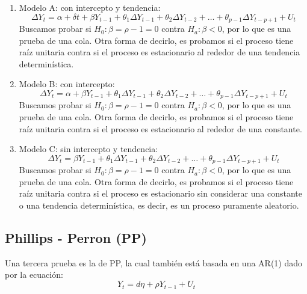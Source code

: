 \documentclass[
]{book}
\begin{document}
\begin{enumerate}
\def\labelenumi{\arabic{enumi}.}
\item
  Modelo A: con intercepto y tendencia:
  \begin{equation*}
  \Delta Y_t = \alpha + \delta t + \beta Y_{t-1} + \theta_1 \Delta Y_{t-1} + \theta_2 \Delta Y_{t-2} + \ldots + \theta_{p-1} \Delta Y_{t-p+1} + U_t
    \end{equation*}
  Buscamos probar si \(H_0 : \beta = \rho - 1 = 0\) contra \(H_a : \beta < 0\), por lo que es una prueba de una cola. Otra forma de decirlo, es probamos si el proceso tiene raíz unitaria contra si el proceso es estacionario al rededor de una tendencia determinística.
\item
  Modelo B: con intercepto:
  \begin{equation*}
   \Delta Y_t = \alpha + \beta Y_{t-1} + \theta_1 \Delta Y_{t-1} + \theta_2 \Delta Y_{t-2} + \ldots + \theta_{p-1} \Delta Y_{t-p+1} + U_t
    \end{equation*}
  Buscamos probar si \(H_0 : \beta = \rho - 1 = 0\) contra \(H_a : \beta < 0\), por lo que es una prueba de una cola. Otra forma de decirlo, es probamos si el proceso tiene raíz unitaria contra si el proceso es estacionario al rededor de una constante.
\item
  Modelo C: sin intercepto y tendencia:
  \begin{equation*}
   \Delta Y_t = \beta Y_{t-1} + \theta_1 \Delta Y_{t-1} + \theta_2 \Delta Y_{t-2} + \ldots + \theta_{p-1} \Delta Y_{t-p+1} + U_t
    \end{equation*}
  Buscamos probar si \(H_0 : \beta = \rho - 1 = 0\) contra \(H_a : \beta < 0\), por lo que es una prueba de una cola. Otra forma de decirlo, es probamos si el proceso tiene raíz unitaria contra si el proceso es estacionario sin considerar una constante o una tendencia determinística, es decir, es un proceso puramente aleatorio.
\end{enumerate}

\hypertarget{phillips---perron-pp}{%
\subsection{Phillips - Perron (PP)}\label{phillips---perron-pp}}

Una tercera prueba es la de PP, la cual también está basada en una AR(1) dado por la ecuación:
\begin{equation}
    Y_t = d \eta + \rho Y_{t-1} + U_t
    \label{eq:URPP}
\end{equation}
\end{document}
